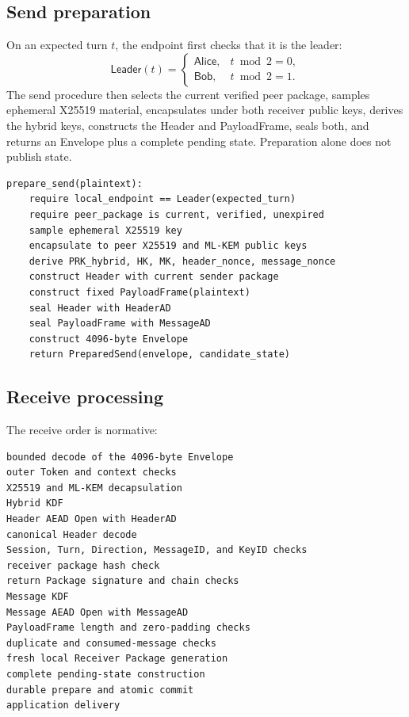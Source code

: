 \documentclass[11pt,letterpaper]{article}
\begin{document}
\subsection{Send preparation}

On an expected turn $t$, the endpoint first checks that it is the leader:
\[
  \mathsf{Leader}(t)=
  \begin{cases}
    \mathsf{Alice}, & t \bmod 2=0,\\
    \mathsf{Bob}, & t \bmod 2=1.
  \end{cases}
\]
The send procedure then selects the current verified peer package, samples ephemeral
X25519 material, encapsulates under both receiver public keys, derives the hybrid keys,
constructs the Header and PayloadFrame, seals both, and returns an Envelope plus a
complete pending state. Preparation alone does not publish state.

\begin{lstlisting}[caption={Abstract send preparation}]
prepare_send(plaintext):
    require local_endpoint == Leader(expected_turn)
    require peer_package is current, verified, unexpired
    sample ephemeral X25519 key
    encapsulate to peer X25519 and ML-KEM public keys
    derive PRK_hybrid, HK, MK, header_nonce, message_nonce
    construct Header with current sender package
    construct fixed PayloadFrame(plaintext)
    seal Header with HeaderAD
    seal PayloadFrame with MessageAD
    construct 4096-byte Envelope
    return PreparedSend(envelope, candidate_state)
\end{lstlisting}

\subsection{Receive processing}

The receive order is normative:
\begin{lstlisting}[caption={Normative receive processing order}]
bounded decode of the 4096-byte Envelope
outer Token and context checks
X25519 and ML-KEM decapsulation
Hybrid KDF
Header AEAD Open with HeaderAD
canonical Header decode
Session, Turn, Direction, MessageID, and KeyID checks
receiver package hash check
return Package signature and chain checks
Message KDF
Message AEAD Open with MessageAD
PayloadFrame length and zero-padding checks
duplicate and consumed-message checks
fresh local Receiver Package generation
complete pending-state construction
durable prepare and atomic commit
application delivery
\end{lstlisting}
\end{document}

